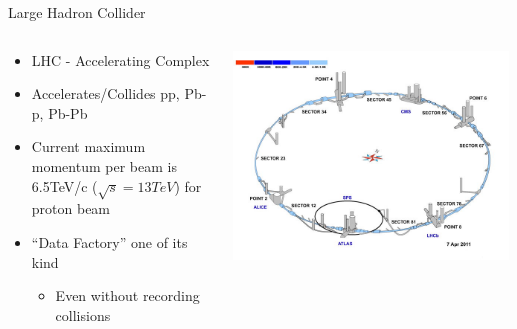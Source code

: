 \documentclass[pdf, 9pt]{beamer}
\begin{document}
  \begin{frame}{Large Hadron Collider}
    \begin{columns}[T]
      \begin{column}{0.6\textwidth}
        \begin{itemize}
          \item LHC - Accelerating Complex
          \item Accelerates/Collides pp, Pb-p, Pb-Pb
          \item Current maximum momentum per beam is 6.5TeV/c ($\sqrt{s}=13TeV$) for proton beam
          \item ``Data Factory'' one of its kind
            \begin{itemize}
              \item Even without recording collisions
            \end{itemize}
        \end{itemize}
      \end{column}
      \begin{column}{0.4\textwidth}
        \includegraphics[width=0.99\textwidth, height=0.55\textheight, keepaspectratio]{figs/lhc/LHC_Fig1.jpg}
      \end{column}
    \end{columns}
  \end{frame}
\end{document}

